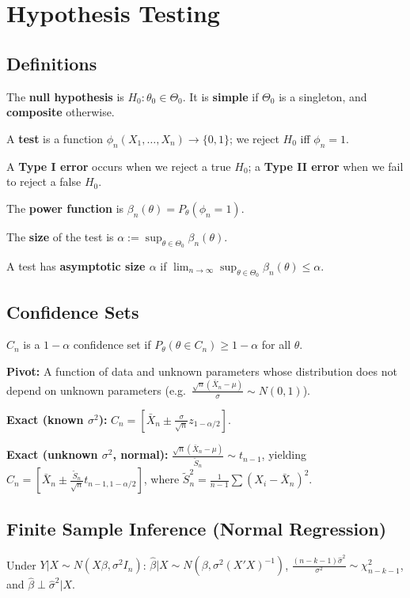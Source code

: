 \section{Hypothesis Testing}

\subsection{Definitions}
The \textbf{null hypothesis} is $H_0:\theta_0\in\Theta_0$. It is \textbf{simple} if $\Theta_0$ is a singleton, and \textbf{composite} otherwise.

A \textbf{test} is a function $\phi_n(X_1,\ldots,X_n)\to\{0,1\}$; we reject $H_0$ iff $\phi_n=1$.

A \textbf{Type I error} occurs when we reject a true $H_0$; a \textbf{Type II error} when we fail to reject a false $H_0$.

The \textbf{power function} is $\beta_n(\theta)=P_\theta(\phi_n=1)$.

The \textbf{size} of the test is $\alpha:=\sup_{\theta\in\Theta_0}\beta_n(\theta)$.

A test has \textbf{asymptotic size $\alpha$} if $\lim_{n\to\infty}\sup_{\theta\in\Theta_0}\beta_n(\theta)\leq\alpha$.

\subsection{Confidence Sets}
$C_n$ is a $1-\alpha$ confidence set if $P_\theta(\theta\in C_n)\geq 1-\alpha$ for all $\theta$.

\textbf{Pivot:} A function of data and unknown parameters whose distribution does not depend on unknown parameters (e.g.\ $\frac{\sqrt{n}(\bar{X}_n-\mu)}{\sigma}\sim N(0,1)$).

\textbf{Exact (known $\sigma^2$):} $C_n = \left[\bar{X}_n \pm \frac{\sigma}{\sqrt{n}}z_{1-\alpha/2}\right]$.

\textbf{Exact (unknown $\sigma^2$, normal):} $\frac{\sqrt{n}(\bar{X}_n-\mu)}{\tilde{S}_n}\sim t_{n-1}$, yielding $C_n = \left[\bar{X}_n \pm \frac{\tilde{S}_n}{\sqrt{n}}t_{n-1,1-\alpha/2}\right]$, where $\tilde{S}_n^2 = \frac{1}{n-1}\sum(X_i-\bar{X}_n)^2$.

\subsection{Finite Sample Inference (Normal Regression)}
Under $Y|X\sim N(X\beta,\sigma^2 I_n)$: $\hat\beta|X\sim N(\beta,\sigma^2(X'X)^{-1})$, $\frac{(n-k-1)\hat\sigma^2}{\sigma^2}\sim\chi^2_{n-k-1}$, and $\hat\beta\perp\hat\sigma^2|X$.

